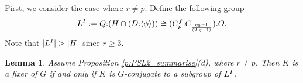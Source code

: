 \documentclass[twoside,a4paper,reqno,11pt]{amsart}
\newcommand{\<}{\langle}
\renewcommand{\>}{\rangle}
\newcommand{\la}{\langle}
\newcommand{\ra}{\rangle}
\newcommand{\geqs}{\geqslant}
\newcommand{\Aut}{\mathrm{Aut}}
\newcommand{\PGammaL}{\mathrm{P\Gamma L}}
\newtheorem{lem}[thm]{Lemma}
\theoremstyle{definition}
\begin{document}
	
	First, we consider the case where $r\ne p$. Define the following group
	\begin{equation}
	\label{e:LI}
	L^{\rm I}:=Q{:}(H\cap (D{:}\la\phi\ra)) \cong (C_p^f{:}C_{\frac{q_0-1}{(2,q-1)}}).O.
	\end{equation}
	Note that $|L^{\rm I}| > |H|$ since $r\geqs 3$.
	
	
	
	
	\begin{lem}
		\label{l:PSL2_d_I}
		Assume Proposition \ref{p:PSL2_summarise}(d), where $r\ne p$. Then $K$ is a fixer of $G$ if and only if $K$ is $G$-conjugate to a subgroup of $L^{\rm I}$.
	\end{lem}
	
\end{document}
